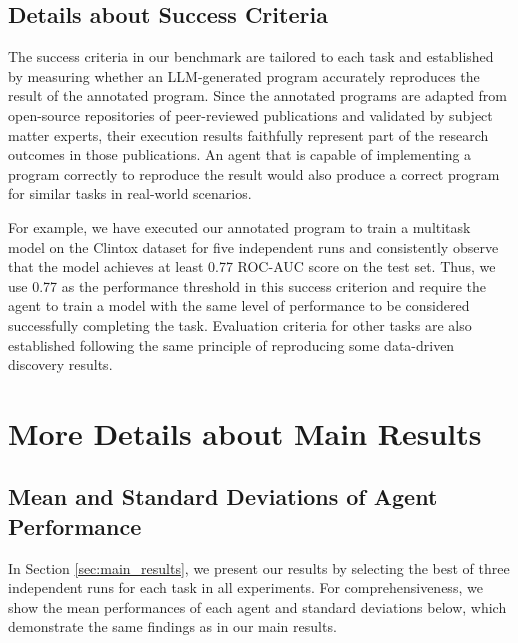\subsection{Details about Success Criteria}
\label{app:eval_details}
The success criteria in our benchmark are tailored to each task and established by measuring whether an LLM-generated program accurately reproduces the result of the annotated program. Since the annotated programs are adapted from open-source repositories of peer-reviewed publications and validated by subject matter experts, their execution results faithfully represent part of the research outcomes in those publications. An agent that is capable of implementing a program correctly to reproduce the result would also produce a correct program for similar tasks in real-world scenarios.

For example, we have executed our annotated program to train a multitask model on the Clintox dataset for five independent runs and consistently observe that the model achieves at least 0.77 ROC-AUC score on the test set. Thus, we use 0.77 as the performance threshold in this success criterion and require the agent to train a model with the same level of performance to be considered successfully completing the task. Evaluation criteria for other tasks are also established following the same principle of reproducing some data-driven discovery results.

\newpage
\setcounter{table}{0}
\renewcommand\thetable{\Alph{section}.\arabic{table}}
\setcounter{figure}{0}
\renewcommand\thefigure{\Alph{section}.\arabic{figure}}

\section{More Details about Main Results}
\label{app:details}

\subsection{Mean and Standard Deviations of Agent Performance}
\label{app:mean_std}

In Section \ref{sec:main_results}, we present our results by selecting the best of three independent runs for each task in all experiments.
For comprehensiveness, we show the mean performances of each agent and standard deviations below, which demonstrate the same findings as in our main results.

